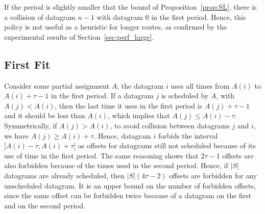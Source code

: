 


      If the period is slightly smaller that the bound of Proposition~\ref{prop:SL}, there is a collision of datagram $n-1$ with datagram $0$ in the first period. Hence, this policy is not useful as a heuristic for longer routes, as confirmed by the experimental results of Section~\ref{sec:perf_large}. 

\subsection{First Fit}

 Consider some partial assignment $A$, the datagram $i$ uses all times from $A(i)$ to $A(i) + \tau -1$ in the first period. If a datagram $j$ is scheduled by $A$, with $A(j) < A(i)$, then the last time it uses in the first period is $A(j)+\tau-1$ and it should be less than $A(i)$, which implies that $A(j) \leq A(i) - \tau$. Symmetrically, if $A(j) > A(i)$, to avoid collision between datagrams $j$ and $i$, we have $A(j) \geq A(i) + \tau$. Hence, datagram $i$ forbids the interval $]A(i) - \tau, A(i) + \tau[$ as offsets for datagrams still not scheduled because of its use of time in the first period. The same reasoning shows that $2\tau -1$ offsets are also forbidden because of the times used in the second period. Hence, if $|S|$ datagrams are already scheduled, then $|S|(4\tau -2)$ offsets are forbidden for any unscheduled datagram. It is an upper bound on the number of forbidden offsets, since the same offset can be forbidden twice because of a datagram on the first and on the second period.

